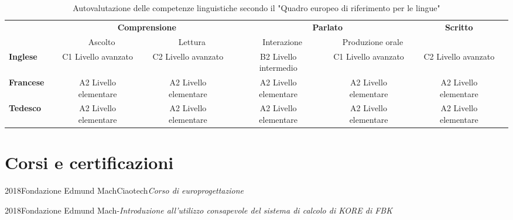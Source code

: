 \documentclass{curriculum}
\begin{document}
        \begin{table}[h]
        \centering
        \fontsize{8}{9}\selectfont
            \begin{tabular}{lccccccccccc}%
            \toprule
\multicolumn{2}{c}{} & \multicolumn{4}{c}{\textbf{Comprensione}}                 & \multicolumn{4}{c}{\textbf{Parlato}}                              & \textbf{Scritto} &\\
\multicolumn{2}{c}{} & \multicolumn{2}{c}{Ascolto} & \multicolumn{2}{c}{Lettura} & \multicolumn{2}{c}{Interazione} & \multicolumn{2}{c}{Produzione orale} & &\\
\cmidrule{3-5} \cmidrule{7-9}\cmidrule{11-12}
\textbf{Inglese}  & \phantom{abc} & C1 Livello avanzato   & \phantom{abc} & C2 Livello avanzato   & \phantom{abc} & B2 Livello intermedio &\phantom{abc} & C1 Livello avanzato  & \phantom{abc} & C2 Livello avanzato & \phantom{abc}\\
\textbf{Francese} & \phantom{abc} & A2 Livello elementare & \phantom{abc} & A2 Livello elementare & \phantom{abc} & A2 Livello elementare &\phantom{abc} & A2 Livello elementare & \phantom{abc} & A2 Livello elementare & \phantom{abc}\\
\textbf{Tedesco}  & \phantom{abc} & A2 Livello elementare & \phantom{abc} & A2 Livello elementare & \phantom{abc} & A2 Livello elementare &\phantom{abc} & A2 Livello elementare & \phantom{abc} & A2 Livello elementare & \phantom{abc}\\
            \bottomrule
        \end{tabular}
        \caption*{\small Autovalutazione delle competenze linguistiche secondo il "Quadro europeo di riferimento per le lingue"}
        \end{table}

    
    \section{Corsi e certificazioni}
    
    \begin{entrylist}
    \entry
        {2018}{Fondazione Edmund Mach}{Ciaotech}{\emph{Corso di europrogettazione}}
    \end{entrylist}
    
    \begin{entrylist}
    \entry
        {2018}{Fondazione Edmund Mach}{-}{\emph{Introduzione all'utilizzo consapevole del sistema di calcolo di KORE di FBK}}
    \end{entrylist}
    
\end{document}
